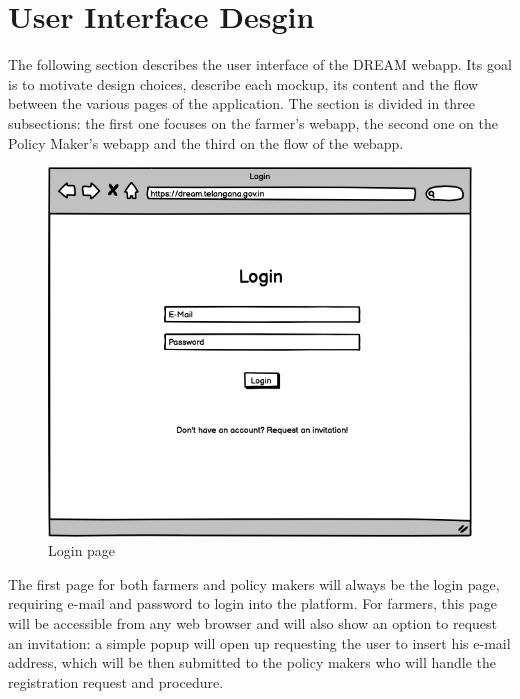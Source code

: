 \documentclass[10pt]{article} %
\begin{document}
\section{User Interface Desgin} %
The following section describes the user interface of the DREAM webapp. Its goal is to motivate design choices, 
describe each mockup, its content and the flow between the various pages of the application.
The section is divided in three subsections: the first one focuses on the farmer's webapp, the second one on the Policy Maker's webapp
and the third on the flow of the webapp.\\
\begin{figure}[h]
    \centering
    \includegraphics[scale=0.4]{images/uimockups/login.png}
    \caption{Login page}
    \label{fig:ui_login}
\end{figure}
The first page for both farmers and policy makers will always be the login page, requiring e-mail and password to login into the platform.
For farmers, this page will be accessible from any web browser and will also show an option to request an invitation: a simple popup will open up requesting
the user to insert his e-mail address, which will be then submitted to the policy makers who will handle the registration request and procedure.
\end{document}
